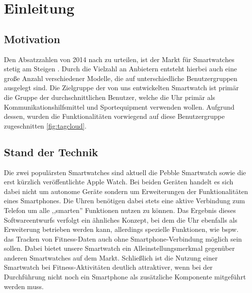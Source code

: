 \chapter{Einleitung}

\section{Motivation}
Den Absatzzahlen von 2014 nach zu urteilen, ist der Markt für Smartwatches stetig am Steigen \cite{absatzzahlen}. Durch die Vielzahl an Anbietern entsteht hierbei auch eine große Anzahl verschiedener Modelle, die auf unterschiedliche Benutzergruppen ausgelegt sind. Die Zielgruppe der von uns entwickelten Smartwatch ist primär die Gruppe der durchschnittlichen Benutzer, welche die Uhr primär als Kommunikationshilfsmittel und Sportequipment verwenden wollen. Aufgrund dessen, wurden die Funktionalitäten vorwiegend auf diese Benutzergruppe zugeschnitten \ref{fig:tagcloud}.

\section{Stand der Technik}
Die zwei populärsten Smartwatches sind aktuell die Pebble Smartwatch sowie die erst kürzlich veröffentlichte Apple Watch. Bei beiden Geräten handelt es sich dabei nicht um autonome Geräte sondern um Erweiterungen der Funktionalitäten eines Smartphones. Die Uhren benötigen dabei stets eine aktive Verbindung zum Telefon um alle ,,smarten'' Funktionen nutzen zu können. Das Ergebnis dieses Softwareentwurfs verfolgt ein ähnliches Konzept, bei dem die Uhr ebenfalls als Erweiterung betrieben werden kann, allerdings spezielle Funktionen, wie bspw. das Tracken von Fitness-Daten auch ohne Smartphone-Verbindung möglich sein sollen. Dabei bietet unsere Smartwatch ein Alleinstellungsmerkmal gegenüber anderen Smartwatches auf dem Markt. Schließlich ist die Nutzung einer Smartwatch bei Fitness-Aktivitäten deutlich attraktiver, wenn bei der Durchführung nicht noch ein Smartphone als zusätzliche Komponente mitgeführt werden muss.

